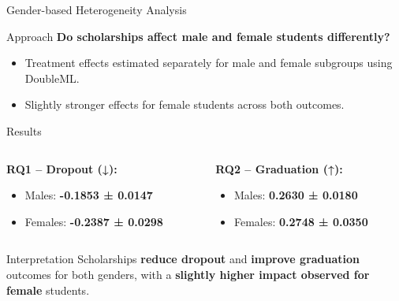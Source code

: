 \documentclass[aspectratio=169]{beamer}
\begin{document}

\begin{frame}{Gender-based Heterogeneity Analysis}
\vspace{5pt}
\begin{alertblock}{Approach}
	\textbf{Do scholarships affect male and female students differently?}
	\vspace{-10pt}
	\begin{itemize}[label=--,itemsep=1pt]
    \item Treatment effects estimated separately for male and female subgroups using DoubleML.
    \item Slightly stronger effects for female students across both outcomes.
\end{itemize}
\end{alertblock}
\vspace{5pt}
\begin{block}{Results}
\vspace{8pt}
\begin{columns}
\begin{column}{0.45\textwidth}
\textbf{RQ1 – Dropout (↓):}
\vspace{-3pt}
\begin{itemize}[label=--,itemsep=1pt]
    \item Males: \textbf{-0.1853 ± 0.0147}
    \item Females: \textbf{-0.2387 ± 0.0298}
\end{itemize}
\end{column}

\begin{column}{0.45\textwidth}
\textbf{RQ2 – Graduation (↑):}
\vspace{-3pt}
\begin{itemize}[label=--,itemsep=1pt]
    \item Males: \textbf{0.2630 ± 0.0180}
    \item Females: \textbf{0.2748 ± 0.0350}
\end{itemize}
\end{column}
\end{columns}
\vspace{4pt}
\end{block}



\vspace{5pt}
\begin{exampleblock}{Interpretation}
Scholarships \textbf{reduce dropout} and \textbf{improve graduation} outcomes for both genders, with a \textbf{slightly higher impact observed for female} students.

\end{exampleblock}

\end{frame}
\end{document}
